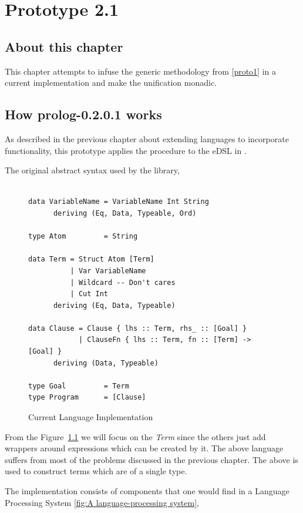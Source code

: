 \documentclass[thesis-solanki.tex]{subfiles}
\begin{document}
\chapter{Prototype 2.1}{\label{proto2.1}}

\section{About this chapter}
This chapter attempts to infuse the generic methodology from \ref{proto1} in a current  implementation \cite{prolog-lib}
and make the unification monadic.

\section{How prolog-0.2.0.1 works}

As described in the previous chapter about extending languages to incorporate functionality, this prototype applies the procedure to the
eDSL in \cite{prolog-lib}.

The original abstract syntax used by the library,
\begin{figure}[h]
\begin{verbatim}

data VariableName = VariableName Int String
      deriving (Eq, Data, Typeable, Ord)

type Atom         = String

data Term = Struct Atom [Term]
          | Var VariableName
          | Wildcard -- Don't cares
          | Cut Int
      deriving (Eq, Data, Typeable)

data Clause = Clause { lhs :: Term, rhs_ :: [Goal] }
            | ClauseFn { lhs :: Term, fn :: [Term] -> [Goal] }
      deriving (Data, Typeable)

type Goal         = Term
type Program      = [Clause]
\end{verbatim}
\caption{Current Language Implementation}
\label{tab:currlangimpl}
\end{figure}

From the Figure~\ref{tab:currlangimpl} we will focus on the \textit{Term} since the others just add wrappers around expressions which can
be created by it. The above language suffers from most of the problems discussed in the previous chapter. The above is used to construct
 terms which are of a single type.


The implementation consists of components that one would find in a Language Processing System \ref{fig:A language-processing system},
\end{document}
